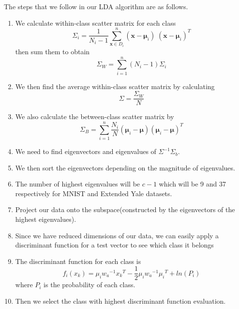 The steps that we follow in our LDA algorithm are as follows.
 
\begin{enumerate}
	
	\item We calculate within-class scatter matrix for each class
          \begin{equation}
            \Sigma_i = \frac{1}{N_{i}-1} \sum\limits_{\pmb x \in D_i}^n (\pmb x - \pmb \mu_i)\;(\pmb x - \pmb \mu_i)^T
          \end{equation} 
          then sum them to obtain
          \begin{equation}
             \Sigma_W = \sum\limits_{i =1}^{n} (N_i - 1) \Sigma_i 
          \end{equation}
	\item We then find the average within-class scatter matrix by calculating 
          \begin{equation}
            \Sigma =\dfrac{\Sigma_W}{N}
          \end{equation}
	\item We also calculate the between-class scatter matrix by 
          \begin{equation}
            \Sigma_B = \sum\limits_{i =1}^n \dfrac{N_i}{N} (\pmb \mu_i - \pmb \mu) (\pmb \mu_i - \pmb \mu)^T
          \end{equation}
	\item We need to find eigenvectors and eigenvalues of $\Sigma^{-1} \Sigma_b$.
	\item We then sort the eigenvectors depending on the magnitude of eigenvalues.
	\item The number of highest eigenvalues will be $c-1$ which will be 9 and 37 respectively for MNIST and Extended Yale datasets.
	\item Project our data onto the subspace(constructed by the eigenvectors of the highest eigenvalues).
	\item Since we have reduced dimensions of our data, we can easily apply a discriminant function for a test vector to see which class it belongs
	\item The discriminant function for each class is 
          \begin{equation}
            f_i(x_k) = \mu_i {w_a}^{-1} {x_k}^T - \dfrac{1}{2} \mu_i {w_a}^{-1} {\mu_i}^T + ln(P_i)
          \end{equation} 
          where $P_i$ is the probability of each class.
	\item Then we select the class with highest discriminant function evaluation.
\end{enumerate}

